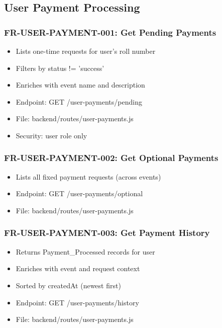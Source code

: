 \documentclass[12pt,a4paper]{article}
\begin{document}
\subsection{User Payment Processing}

\subsubsection{FR-USER-PAYMENT-001: Get Pending Payments}
\begin{itemize}
  \item Lists one-time requests for user's roll number
  \item Filters by status != 'success'
  \item Enriches with event name and description
  \item Endpoint: GET /user-payments/pending
  \item File: backend/routes/user-payments.js
  \item Security: user role only
\end{itemize}

\subsubsection{FR-USER-PAYMENT-002: Get Optional Payments}
\begin{itemize}
  \item Lists all fixed payment requests (across events)
  \item Endpoint: GET /user-payments/optional
  \item File: backend/routes/user-payments.js
\end{itemize}

\subsubsection{FR-USER-PAYMENT-003: Get Payment History}
\begin{itemize}
  \item Returns Payment\_Processed records for user
  \item Enriches with event and request context
  \item Sorted by createdAt (newest first)
  \item Endpoint: GET /user-payments/history
  \item File: backend/routes/user-payments.js
\end{itemize}
\end{document}

